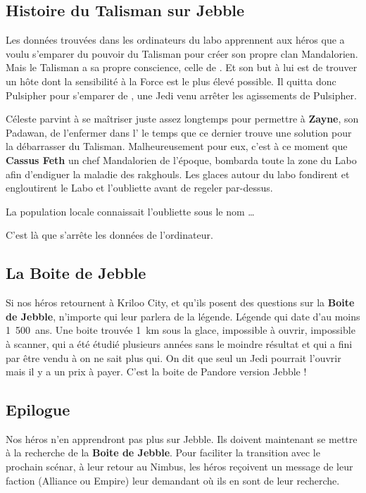 \subsection{Histoire du Talisman sur Jebble}\label{sec:talisman-jebble}
Les données trouvées dans les ordinateurs du labo apprennent aux héros que  a voulu s’emparer du pouvoir du Talisman pour créer son propre clan Mandalorien. Mais le Talisman a sa propre conscience, celle de . Et son but à lui est de trouver un hôte dont la sensibilité à la Force est le plus élevé possible. Il quitta donc Pulsipher pour s’emparer de , une Jedi venu arrêter les agissements de Pulsipher.

Céleste parvint à se maîtriser juste assez longtemps pour permettre à \textbf{Zayne}, son Padawan, de l’enfermer dans l’ le temps que ce dernier trouve une solution pour la débarrasser du Talisman. Malheureusement pour eux, c’est à ce moment que \textbf{Cassus Feth} un chef Mandalorien de l’époque, bombarda toute la zone du Labo afin d’endiguer la maladie des rakghouls. Les glaces autour du labo fondirent et engloutirent le Labo et l’oubliette avant de regeler par-dessus.

La population locale connaissait l’oubliette sous le nom \ldots 

C’est là que s’arrête les données de l’ordinateur.

\subsection{La Boite de Jebble}\label{sec:boite-de-jebble}
Si nos héros retournent à Kriloo City, et qu’ils posent des questions sur la \textbf{Boite de Jebble}, n’importe qui leur parlera de la légende. Légende qui date d’au moins 1~500~ans. Une boite trouvée 1~km sous la glace, impossible à ouvrir, impossible à scanner, qui a été étudié plusieurs années sans le moindre résultat et qui a fini par être vendu à on ne sait plus qui. On dit que seul un Jedi pourrait l’ouvrir mais il y a un prix à payer. C’est la boite de Pandore version Jebble !

\subsection{\’Epilogue}
Nos héros n’en apprendront pas plus sur Jebble. Ils doivent maintenant se mettre à la recherche de la \textbf{Boite de Jebble}. Pour faciliter la transition avec le prochain scénar, à leur retour au Nimbus, les héros reçoivent un message de leur faction (Alliance ou Empire) leur demandant où ils en sont de leur recherche.

